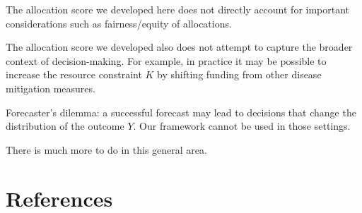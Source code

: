 \documentclass{article}
\begin{document}
The allocation score we developed here does not directly account for important considerations such as fairness/equity of allocations.

The allocation score we developed also does not attempt to capture the broader context of decision-making. For example, in practice it may be possible to increase the resource constraint $K$ by shifting funding from other disease mitigation measures.

Forecaster's dilemma: a successful forecast may lead to decisions that change the distribution of the outcome $Y$. Our framework cannot be used in those settings.

There is much more to do in this general area.

\section{References}

\printbibliography
\end{document}
